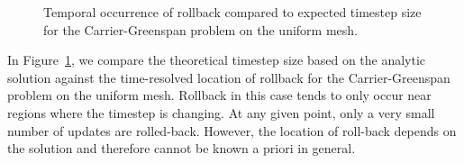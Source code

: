 \documentclass[10pt,letterpaper]{article}
\begin{document}
\begin{figure}
\centering
{}
\caption{Temporal occurrence of rollback compared to expected timestep size for the Carrier-Greenspan problem on the uniform mesh.}
\label{fig:rb:temporal}
\end{figure}

In Figure~\ref{fig:rb:temporal}, we compare the theoretical timestep size based on the analytic solution against the time-resolved location of rollback for the Carrier-Greenspan problem on the uniform mesh. Rollback in this case tends to only occur near regions where the timestep is changing. At any given point, only a very small number of updates are rolled-back. However, the location of roll-back depends on the solution and therefore cannot be known a priori in general.
\end{document}
